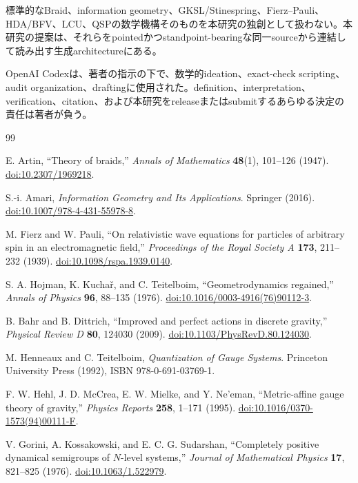 \documentclass[11pt]{article}
\theoremstyle{definition}
\theoremstyle{remark}
\begin{document}
標準的なBraid、information geometry、GKSL/Stinespring、Fierz--Pauli、HDA/BFV、LCU、QSPの数学機構そのものを本研究の独創として扱わない。本研究の提案は、それらをpointedかつstandpoint-bearingな同一sourceから連結して読み出す生成architectureにある。

OpenAI Codexは、著者の指示の下で、数学的ideation、exact-check scripting、audit organization、draftingに使用された。definition、interpretation、verification、citation、および本研究をreleaseまたはsubmitするあらゆる決定の責任は著者が負う。

\begin{thebibliography}{99}
\raggedright
\footnotesize
\setlength{\itemsep}{0pt}
\setlength{\parskip}{0pt}

E. Artin, ``Theory of braids,'' \emph{Annals of Mathematics} \textbf{48}(1), 101--126 (1947). \href{https://doi.org/10.2307/1969218}{doi:10.2307/1969218}.

S.-i. Amari, \emph{Information Geometry and Its Applications}. Springer (2016). \href{https://doi.org/10.1007/978-4-431-55978-8}{doi:10.1007/978-4-431-55978-8}.

M. Fierz and W. Pauli, ``On relativistic wave equations for particles of arbitrary spin in an electromagnetic field,'' \emph{Proceedings of the Royal Society A} \textbf{173}, 211--232 (1939). \href{https://doi.org/10.1098/rspa.1939.0140}{doi:10.1098/rspa.1939.0140}.

S. A. Hojman, K. Kucha\v{r}, and C. Teitelboim, ``Geometrodynamics regained,'' \emph{Annals of Physics} \textbf{96}, 88--135 (1976). \href{https://doi.org/10.1016/0003-4916(76)90112-3}{doi:10.1016/0003-4916(76)90112-3}.

B. Bahr and B. Dittrich, ``Improved and perfect actions in discrete gravity,'' \emph{Physical Review D} \textbf{80}, 124030 (2009). \href{https://doi.org/10.1103/PhysRevD.80.124030}{doi:10.1103/PhysRevD.80.124030}.

M. Henneaux and C. Teitelboim, \emph{Quantization of Gauge Systems}. Princeton University Press (1992), ISBN 978-0-691-03769-1.

F. W. Hehl, J. D. McCrea, E. W. Mielke, and Y. Ne'eman, ``Metric-affine gauge theory of gravity,'' \emph{Physics Reports} \textbf{258}, 1--171 (1995). \href{https://doi.org/10.1016/0370-1573(94)00111-F}{doi:10.1016/0370-1573(94)00111-F}.

V. Gorini, A. Kossakowski, and E. C. G. Sudarshan, ``Completely positive dynamical semigroups of $N$-level systems,'' \emph{Journal of Mathematical Physics} \textbf{17}, 821--825 (1976). \href{https://doi.org/10.1063/1.522979}{doi:10.1063/1.522979}.


\end{thebibliography}
\end{document}
